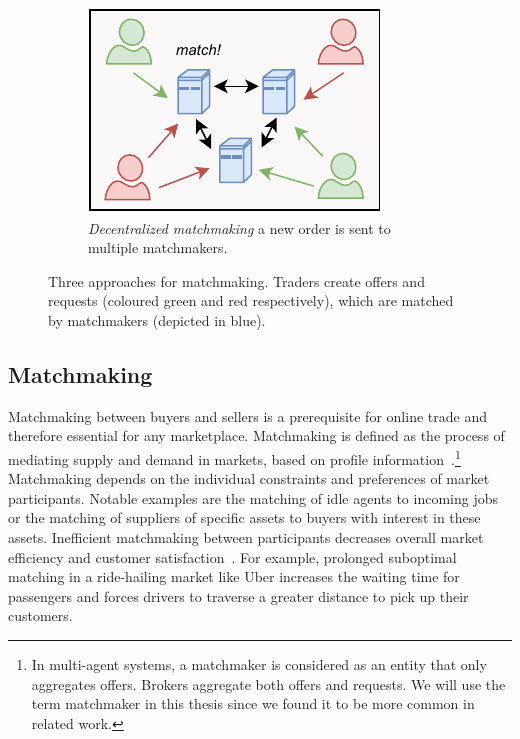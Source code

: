 \begin{figure}[t]
\begin{subfigure}[t]{.33\textwidth}
		\includegraphics[width=.9\linewidth]{introduction/assets/decentralized_matchmaking}
		\caption{\emph{Decentralized matchmaking} a new order is sent to multiple matchmakers.}
		\label{fig:decentralized_matchmaking}
	\end{subfigure}
	\caption{Three approaches for matchmaking. Traders create offers and requests (coloured green and red respectively), which are matched by matchmakers (depicted in blue).}
	\label{fig:matching_architectures}
\end{figure}

\subsection{Matchmaking}
\label{sec:matchmaking}
Matchmaking between buyers and sellers is a prerequisite for online trade and therefore essential for any marketplace.
Matchmaking is defined as the process of mediating supply and demand in markets, based on profile information~\cite{veit2003matchmaking}.\footnote{In multi-agent systems, a matchmaker is considered as an entity that only aggregates offers. Brokers aggregate both offers and requests. We will use the term matchmaker in this thesis since we found it to be more common in related work.}
Matchmaking depends on the individual constraints and preferences of market participants.
Notable examples are the matching of idle agents to incoming jobs or the matching of suppliers of specific assets to buyers with interest in these assets.
Inefficient matchmaking between participants decreases overall market efficiency and customer satisfaction~\cite{Wu2015TheM}.
For example, prolonged suboptimal matching in a ride-hailing market like Uber increases the waiting time for passengers and forces drivers to traverse a greater distance to pick up their customers.

